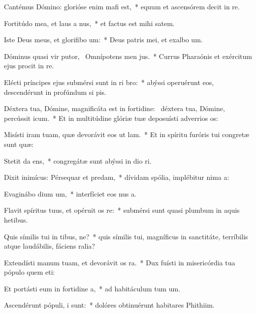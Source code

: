 \item Cantémus Dómino: glorióse enim mafi est,~* equum et ascensórem decit in re.
\item Fortitúdo mea, et laus a nus,~* et factus est mihi  satem.
\item Iste Deus meus, et glorifibo um:~* Deus patris mei, et exalbo um.
\item Dóminus quasi vir putor,~\pscross{} Omnípotens men jus.~* Currus Pharaónis et exércitum ejus procit in re.
\item Elécti príncipes ejus submérsi sunt in ri bro:~* abýssi operuérunt eos, descendérunt in profúndum si pis.
\item Déxtera tua, Dómine, magnificáta est in fortidine:~\pscross{} déxtera tua, Dómine, percússit icum.~* Et in multitúdine glóriæ tuæ deposuísti adverrios os:
\item Misísti iram tuam, quæ devorávit eos ut lam.~* Et in spíritu furóris tui congretæ sunt quæ:
\item Stetit da ens,~* congregátæ sunt abýssi in dio ri.
\item Dixit inimícus: Pérsequar et predam,~* dívidam spólia, implébitur nima a:
\item Evaginábo dium um,~* interfíciet eos nus a.
\item Flavit spíritus tuus, et opéruit os re:~* submérsi sunt quasi plumbum in aquis hetibus.
\item Quis símilis tui in tibus, ne?~* quis símilis tui, magníficus in sanctitáte, terríbilis atque laudábilis, fáciens ralia?
\item Extendísti manum tuam, et devorávit os ra.~* Dux fuísti in misericórdia tua pópulo quem eti:
\item Et portásti eum in fortidine a,~* ad habitáculum tum um.
\item Ascendérunt pópuli,  i sunt:~* dolóres obtinuérunt habitares Phithiim.
